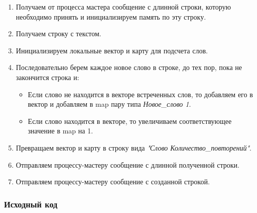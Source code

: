\documentclass[12pt,a4paper]{report}
\begin{document}
\begin{enumerate}
							\begin{enumerate}
								\item Получаем от процесса мастера сообщение с длинной строки, которую необходимо принять и инициализируем память по эту строку.
								\item Получаем строку с текстом.
								\item Инициализируем локальные вектор и карту для подсчета слов.
								\item Последовательно берем каждое новое слово в строке, до тех пор, пока не закончится строка и:
									\begin{itemize}
										\item Если слово не находится в векторе встреченных слов, то добавляем его в вектор и добавляем в map пару типа \textit{Новое\_слово 1}.
										\item Если слово находится в векторе, то увеличиваем соответствующее значение в map на 1.
									\end{itemize}
								\item Превращаем вектор и карту в строку вида \textit{"Слово Количество\_повторений"}.
								\item Отправляем процессу-мастеру сообщение с длинной полученной строки.
								\item Отправляем процессу-мастеру сообщение с созданной строкой.
							\end{enumerate}
					\end{enumerate}
				\subsubsection{Исходный код}
					
\end{document}
